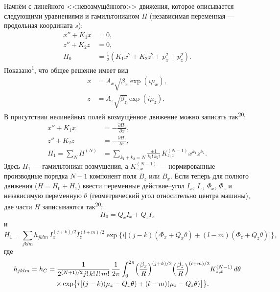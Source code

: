 \documentclass[11pt,a4paper]{article}
\begin{document}
Начнём с линейного <<невозмущённого>> движения, которое описывается следующими
уравнениями и гамильтонианом $H$ (независимая переменная --- продольная
координата $s$):
\begin{equation}
\begin{aligned}
x''+K_1 x&=0,\\
z''+K_2 z&=0,\\
H_0&=\tfrac12(K_1 x^2+K_2 z^2+p_x^2+p_z^2).
\end{aligned}
\end{equation}
Показано\textsuperscript{1}, что общее решение имеет вид
\begin{equation}
\begin{aligned}
x&=A_x\sqrt{\beta_x}\exp(i\mu_x),\\
z&=A_z\sqrt{\beta_z}\exp(i\mu_z).
\end{aligned}
\end{equation}
В присутствии нелинейных полей возмущённое движение можно записать так\textsuperscript{20}:
\begin{equation}
\begin{aligned}
x''+K_1 x&=-\frac{\partial H_1}{\partial x},\\
z''+K_2 z&=-\frac{\partial H_1}{\partial z},\\
H_1=\sum_N H^{(N)}
&=\sum_{k_1+k_2=N}\frac{\pm 1}{k_1!\,k_2!}\,K_{z,x}^{(N-1)}x^{k_1}z^{k_2}.
\end{aligned}
\end{equation}
Здесь $H_1$ --- гамильтониан возмущения, а $K_{z,x}^{(N-1)}$ --- нормированные
производные порядка $N-1$ компонент поля $B_z$ или $B_x$. Если теперь для полного
движения ($H=H_0+H_1$) ввести переменные действие--угол $I_x$, $I_z$, $\Phi_x$,
$\Phi_z$ и независимую переменную $\theta$ (геометрический угол относительно
центра машины), две части $H$ записываются так\textsuperscript{20}:
\begin{equation}
H_0=Q_x I_x+Q_z I_z
\end{equation}
и
\begin{equation}
H_1=\sum_{jklm}h_{jklm}\,I_x^{(j+k)/2}I_z^{(l+m)/2}
\exp\bigl\{i\bigl[(j-k)(\Phi_x+Q_x\theta)+(l-m)(\Phi_z+Q_z\theta)\bigr]\bigr\},
\end{equation}
где
\begin{align*}
h_{jklm}=h_C
&=\frac{1}{2^{(N+1)/2}j!\,k!\,l!\,m!}\,\frac{1}{2\pi}
\int_0^{2\pi}
\Bigl(\frac{\beta_x}{R}\Bigr)^{(j+k)/2}
\Bigl(\frac{\beta_z}{R}\Bigr)^{(l+m)/2}
K_{z,x}^{(N-1)}\,d\theta\\
&\quad\times\exp\bigl\{i\bigl[(j-k)(\mu_x-Q_x\theta)+(l-m)(\mu_z-Q_z\theta)\bigr]\bigr\}.
\end{align*}
\end{document}
